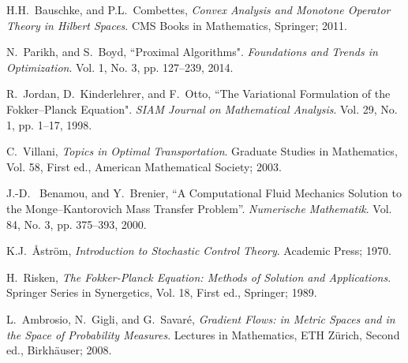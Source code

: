 \documentclass[letterpaper,10pt,twocolumn,conference]{ieeeconf}
\begin{document}
\begin{thebibliography}{99}%


H.H.~Bauschke, and P.L.~Combettes, \emph{Convex Analysis and Monotone Operator Theory in Hilbert Spaces}. CMS Books in Mathematics, Springer; 2011.


N.~Parikh, and S.~Boyd, ``Proximal Algorithms". \emph{Foundations and Trends in Optimization}. Vol. 1, No. 3, pp. 127--239, 2014.




R.~Jordan, D.~Kinderlehrer, and F.~Otto, ``The Variational Formulation of the Fokker--Planck Equation". \emph{SIAM Journal on Mathematical Analysis}. Vol. 29, No. 1, pp. 1--17, 1998.


C.~Villani, \emph{Topics in Optimal Transportation}. Graduate Studies in
Mathematics, Vol. 58, First ed., American Mathematical Society; 2003.

J.-D.~ Benamou, and Y.~Brenier,
``A Computational Fluid Mechanics Solution to the
Monge--Kantorovich Mass Transfer Problem''. \emph{Numerische Mathematik}. Vol. 84, No. 3, pp. 375--393, 2000.
\balance


K.J.~\AA str\"om, \emph{Introduction to Stochastic Control Theory}. Academic Press; 1970.




H.~Risken, \emph{The Fokker-Planck Equation: Methods of Solution and Applications}. Springer Series in Synergetics, Vol. 18, First ed., Springer; 1989.




L.~Ambrosio, N.~Gigli, and G.~Savar{\'e}, \emph{Gradient Flows: in Metric Spaces and in the Space of Probability Measures}. Lectures in Mathematics, ETH Z\"{u}rich, Second ed., Birkh\"{a}user; 2008.


\end{thebibliography}
\end{document}
